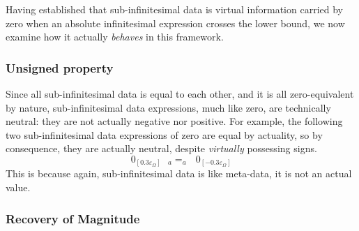 \documentclass{article}
\begin{document}
Having established that sub-infinitesimal data is virtual information carried by zero when an absolute infinitesimal expression crosses the lower bound, we now examine how it actually \textit{behaves} in this framework. 

\subsubsection{Unsigned property}

Since all sub-infinitesimal data is equal to each other, and it is all zero-equivalent by nature, sub-infinitesimal data expressions, much like zero, are technically neutral: they are not actually negative nor positive. For example, the following two sub-infinitesimal data expressions of zero are equal by actuality, so by consequence, they are actually neutral, despite \textit{virtually} possessing signs.
$$0_{[0.3\varepsilon_\Omega]} \text{ }{}_a{=}_a \text{ } 0_{[-0.3\varepsilon_\Omega]} $$ This is because again, sub-infinitesimal data is like meta-data, it is not an actual value.

\subsubsection{Recovery of Magnitude}
\end{document}
